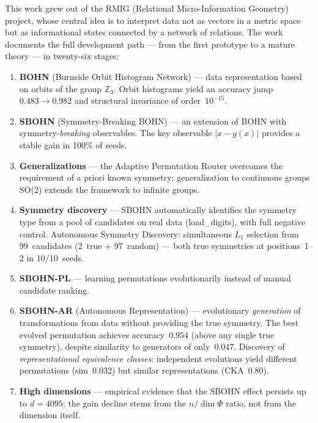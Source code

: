 \documentclass[11pt,a4paper]{report}
\begin{document}
This work grew out of the RMIG (Relational Micro-Information Geometry) project, whose central idea is to interpret data not as vectors in a metric space but as informational states connected by a network of relations. The work documents the full development path --- from the first prototype to a mature theory --- in twenty-six stages:

\begin{enumerate}
\item \textbf{BOHN} (Burnside Orbit Histogram Network) --- data representation based on orbits of the group $\mathbb{Z}_3$. Orbit histograms yield an accuracy jump $0.483\to 0.982$ and structural invariance of order~$10^{-15}$.

\item \textbf{SBOHN} (Symmetry-Breaking BOHN) --- an extension of BOHN with symmetry-\emph{breaking} observables. The key observable $|x-g(x)|$ provides a stable gain in 100\% of seeds.

\item \textbf{Generalizations} --- the Adaptive Permutation Router overcomes the requirement of a priori known symmetry; generalization to continuous groups SO(2) extends the framework to infinite groups.

\item \textbf{Symmetry discovery} --- SBOHN automatically identifies the symmetry type from a pool of candidates on real data (load\_digits), with full negative control. Autonomous Symmetry Discovery: simultaneous $L_1$ selection from 99~candidates (2~true + 97~random) --- both true symmetries at positions~1--2 in 10/10~seeds.

\item \textbf{SBOHN-PL} --- learning permutations evolutionarily instead of manual candidate ranking.

\item \textbf{SBOHN-AR} (Autonomous Representation) --- evolutionary \emph{generation} of transformations from data without providing the true symmetry. The best evolved permutation achieves accuracy~$0.954$ (above any single true symmetry), despite similarity to generators of only~$0.047$. Discovery of \emph{representational equivalence classes}: independent evolutions yield different permutations (sim~$0.032$) but similar representations (CKA~$0.80$).

\item \textbf{High dimensions} --- empirical evidence that the SBOHN effect persists up to $d=4095$; the gain decline stems from the $n/\dim\Phi$ ratio, not from the dimension itself.


\end{enumerate}
\end{document}

